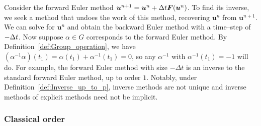 \begin{example}\label{ex:FE_inv_2}
	Consider the forward Euler method $\bm{u}^{n+1} = \bm{u}^{n} + \Delta t \bm{F}(\bm{u}^{n})$. To find its inverse, we seek a method that undoes the work of this method, recovering $\bm{u}^{n}$ from $\bm{u}^{n+1}$. We can solve for $\bm{u}^{n}$ and obtain the backward Euler method with a time--step of $-\Delta t$. Now suppose  $\alpha \in G$ corresponds to the forward Euler method. By Definition~\ref{def:Group_operation}, we have $(\alpha^{-1}\alpha)(t_1) = \alpha(t_1) + \alpha^{-1}(t_1) = 0$, so any $\alpha^{-1}$ with $\alpha^{-1}(t_1) = -1$ will do. For example, the forward 	Euler method with size $-\Delta t$ is an inverse to the standard forward Euler method, up to order $1$. Notably, under Definition~\ref{def:Inverse_up_to_p}, inverse methods are not unique and inverse methods of explicit methods need not be implicit.
\end{example}


\subsubsection{Classical order}\label{sec:Classical_order}


